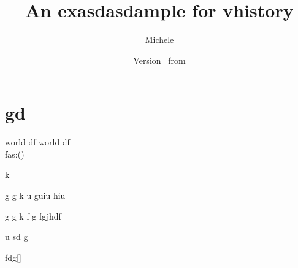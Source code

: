 \documentclass{article}
\author{Michele}
\newcommand{\docTitle}{An exasdasdample for vhistory}
\begin{document}
\section{gd}
	world df \textbf{\gitRel}
	world df \textbf{\gitRel}\\
	fas:\gitRoff(\gitCommitterDate)\\
	\begin{changelog}[author=Michele]
		\begin{version}[version=1.20]
			\added
			\item k
		\end{version}
		
		\begin{version}[version=\gitReln]
			\added
			\item  g g k u guiu  hiu
		\end{version}
		
		\begin{version}[version=\gitReln]
			\added
			\item  g g k f g fgjhdf
			\item u sd g
		\end{version} 
	\end{changelog}

fdg[\vhCurrentVersion]



	\title{\docTitle}
	\author{\vhListAllAuthors}
	\date{Version \vhCurrentVersion\ from \vhCurrentDate}

	\begin{versionhistory}
	\end{versionhistory}
\newpage
\end{document}
